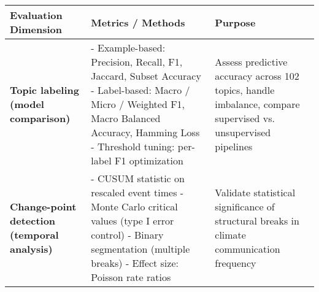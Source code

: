\documentclass{article}
\begin{document}
\begin{tabular}{|p{3.5cm}|p{7cm}|p{6cm}|}
\hline
\rowcolor{white}
\textbf{Evaluation Dimension} & \textbf{Metrics / Methods} & \textbf{Purpose} \\
\hline
\textbf{Topic labeling (model comparison)} & 
- Example-based: Precision, Recall, F1, Jaccard, Subset Accuracy \newline
- Label-based: Macro / Micro / Weighted F1, Macro Balanced Accuracy, Hamming Loss \newline
- Threshold tuning: per-label F1 optimization & 
Assess predictive accuracy across 102 topics, handle imbalance, compare supervised vs. unsupervised pipelines \\
\hline
\textbf{Change-point detection (temporal analysis)} &
- CUSUM statistic on rescaled event times \newline
- Monte Carlo critical values (type I error control) \newline
- Binary segmentation (multiple breaks) \newline
- Effect size: Poisson rate ratios &
Validate statistical significance of structural breaks in climate communication frequency \\
\hline
\end{tabular}
\end{document}
